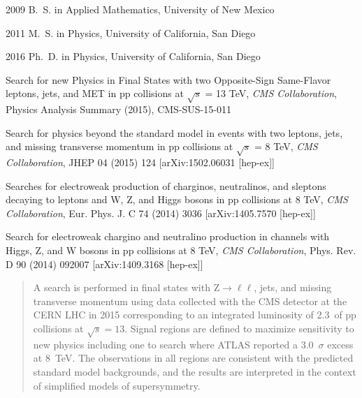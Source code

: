 \begin{frontmatter}
\begin{vitapage}                                                               
\begin{vita}                                                                   
  \item[2009] B.~S. in Applied Mathematics, University of New Mexico
  \item[2011] M.~S. in Physics, University of California, San Diego
  \item[2016] Ph.~D. in Physics, University of California, San Diego       
\end{vita}                                                                     
\begin{publications}                                                           
\item Search for new Physics in Final States with two Opposite-Sign Same-Flavor leptons, jets, and MET in pp collisions at $\sqrt{s}$ = 13 TeV, {\it CMS Collaboration}, Physics Analysis Summary (2015), CMS-SUS-15-011 
\item Search for physics beyond the standard model in events with two leptons, jets, and missing transverse momentum in pp collisions at $\sqrt{s}$ = 8 TeV, {\it CMS Collaboration}, JHEP 04 (2015) 124 [arXiv:1502.06031 [hep-ex]]
\item Searches for electroweak production of charginos, neutralinos, and sleptons decaying to leptons and W, Z, and Higgs bosons in pp collisions at 8 TeV, {\it CMS Collaboration}, Eur. Phys. J. C 74 (2014) 3036 [arXiv:1405.7570 [hep-ex]]
\item Search for electroweak chargino and neutralino production in channels with Higgs, Z, and W bosons in pp collisions at 8 TeV, {\it CMS Collaboration}, Phys. Rev. D 90 (2014) 092007 [arXiv:1409.3168 [hep-ex]]

\end{publications}                                                             
\end{vitapage}                                                                 
                                                                               

\begin{abstract}
A search is performed in final states with Z$\rightarrow\ell\ell$, jets, and missing transverse momentum using data collected with the
CMS detector at the CERN LHC in 2015 corresponding to an integrated luminosity of 2.3~\fbinv of pp collisions at $\sqrt{s}=13$\TeV.
Signal regions are defined to maximize sensitivity to new physics including one to search where ATLAS reported a 3.0~$\sigma$ excess at 8~TeV.
The observations in all regions are consistent with the predicted standard model backgrounds,
and the results are interpreted in the context of simplified models of supersymmetry.
\end{abstract}


\end{frontmatter}
